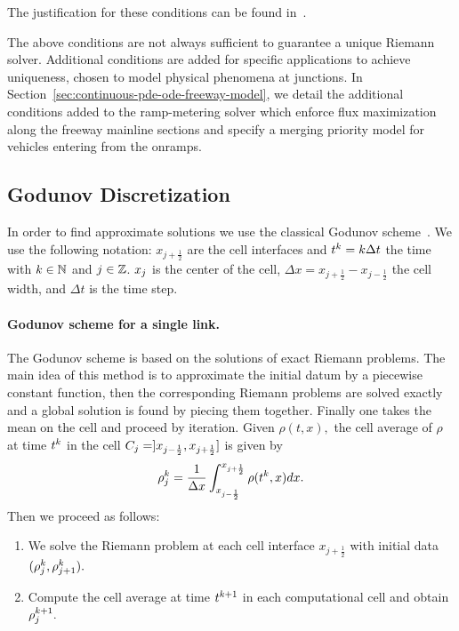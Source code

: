 The justification for these conditions can be found in~\cite{garavello2006traffic}.

The above conditions are not always sufficient to guarantee a unique Riemann solver. Additional conditions are added for specific applications to achieve uniqueness, chosen to model physical phenomena at junctions. In Section~\ref{sec:continuous-pde-ode-freeway-model}, we detail the additional conditions added to the ramp-metering solver which enforce flux maximization along the freeway mainline sections and specify a merging priority model for vehicles entering from the onramps.

\subsection{Godunov Discretization}
\label{sec:godunov-discretization}

In order to find approximate solutions we use the classical Godunov scheme~\cite{godunov1959}. We use the following notation: $x_{j+\frac{1}{2}}$ are the cell interfaces and   $t^{k}=k\Delta t$ the time with $k\in\mathbb{N}$ and $j\in\mathbb{Z}$. $x_{j}$ is the center of the cell, $\Delta x=x_{j+\frac{1}{2}}-x_{j-\frac{1}{2}}$ the cell width, and $\Delta t$ is the time step. 
\paragraph{Godunov scheme for a single link.}

The Godunov scheme is based on the solutions of exact Riemann problems. The main idea of this method is to approximate the initial datum by a piecewise constant function, then the corresponding Riemann problems are solved exactly and a global solution is found by piecing them together. Finally one takes the mean on the cell and proceed by iteration. Given $\rho(t,x),$ the cell average of $\rho$ at time $t^{k}$ in the cell $C_{j}=]x_{j-\frac{1}{2}},x_{j+\frac{1}{2}}]$ is given by 
\begin{equation}
\rho_{j}^{k}=\dfrac{1}{\Delta x}\int_{x_{j-\frac{1}{2}}}^{x_{j+\frac{1}{2}}}\rho(t^{k},x)dx.\label{eq:godproj}
\end{equation}
Then we proceed as follows:
\begin{enumerate}
	\item We solve the Riemann problem at each cell interface $x_{j+\frac{1}{2}}$ with initial data $(\rho^{k}_{j},\rho^{k}_{j+1}).$
	\item Compute the cell average at time $t^{k +1}$ in each computational cell and obtain $\rho^{k +1}_{j}.$ 
\end{enumerate}

